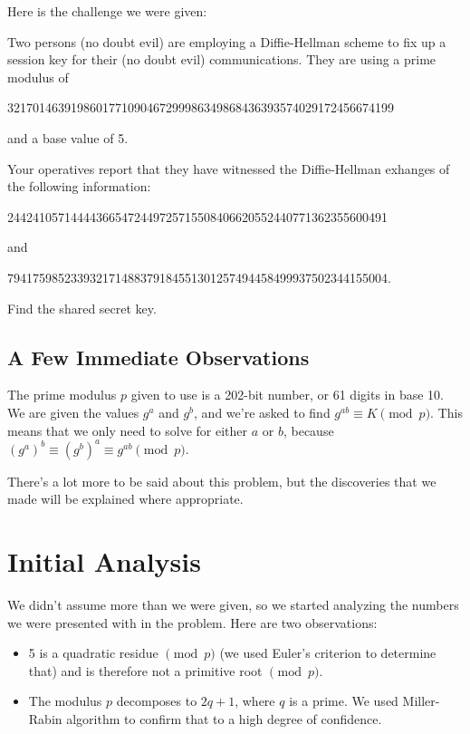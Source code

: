 \documentclass{article}
\begin{document}
Here is the challenge we were given:

\begin{displayquote}
  Two persons (no doubt evil) are employing a Diffie-Hellman scheme to fix up a session key for their (no doubt evil) communications. They are using a prime modulus of

  3217014639198601771090467299986349868436393574029172456674199

  and a base value of 5.

  Your operatives report that they have witnessed the Diffie-Hellman exhanges of the following information:

  244241057144443665472449725715508406620552440771362355600491

  and

  794175985233932171488379184551301257494458499937502344155004.

  Find the shared secret key.
\end{displayquote}

\subsection{A Few Immediate Observations}

The prime modulus $p$ given to use is a 202-bit number, or 61 digits in base 10. We are given the values $g^a$ and $g^b$, and we're asked to find $g^{ab} \equiv K \pmod{p}$. This means that we only need to solve for either $a$ or $b$, because $(g^a)^b \equiv (g^b)^a \equiv g^{ab} \pmod{p}$.

There's a lot more to be said about this problem, but the discoveries that we made will be explained where appropriate.

\section{Initial Analysis}

We didn't assume more than we were given, so we started analyzing the numbers we were presented with in the problem. Here are two observations:

\begin{itemize}
  \item 5 is a quadratic residue $\pmod{p}$ (we used Euler's criterion to determine that) and is therefore not a primitive root $\pmod{p}$.

  \item The modulus $p$ decomposes to $2q + 1$, where $q$ is a prime. We used Miller-Rabin algorithm to confirm that to a high degree of confidence.
\end{itemize}
\end{document}
